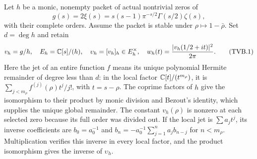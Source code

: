 Let $h$ be a monic, nonempty packet of actual nontrivial zeros of
\[
 g(s)=2\xi(s)=s(s-1)\pi^{-s/2}\Gamma(s/2)\zeta(s),
\]
with their complete orders. Assume the packet is stable under
$\rho\mapsto1-\bar\rho$. Set $d=\deg h$ and retain
\[
 v_h=g/h,\quad E_h=\mathbb{C}[s]/(h),\quad
 \upsilon_h=[v_h]_h\in E_h^\times,\quad
 w_h(t)=\frac{|v_h(1/2+it)|^2}{2\pi}.
 \tag{TVB.1}
\]
Here the jet of an entire function $f$ means its unique polynomial
Hermite remainder of degree less than $d$: in the local factor
$\mathbb{C}[t]/(t^{m_\rho})$, it is
$\sum_{j<m_\rho}f^{(j)}(\rho)t^j/j!$, with $t=s-\rho$.
The coprime factors of $h$ give the isomorphism to their product
by monic division and Bezout's identity, which supplies the
unique global remainder. The constant $v_h(\rho)$ is nonzero
at each selected zero because its full order was divided out.
If the local jet is $\sum a_jt^j$, its inverse coefficients are
$b_0=a_0^{-1}$ and
$b_n=-a_0^{-1}\sum_{j=1}^n a_jb_{n-j}$ for $n<m_\rho$.
Multiplication verifies this inverse in every local factor,
and the product isomorphism gives the inverse of $\upsilon_h$.

